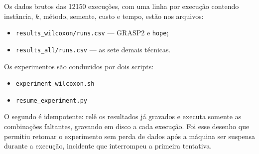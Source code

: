 \documentclass[12pt,a4paper]{article}
\begin{document}
Os dados brutos das \num{12150} execuções, com uma linha por execução
contendo instância, $k$, método, semente, custo e tempo, estão nos
arquivos:

\begin{itemize}
  \item \texttt{results\_wilcoxon/runs.csv} --- GRASP2 e \texttt{hope};
  \item \texttt{results\_all/runs.csv} --- as sete demais técnicas.
\end{itemize}

Os experimentos são conduzidos por dois scripts:

\begin{itemize}
  \item \texttt{experiment\_wilcoxon.sh}
  \item \texttt{resume\_experiment.py}
\end{itemize}

\begin{sloppypar}
O segundo é idempotente: relê os resultados já gravados e executa somente
as combinações faltantes, gravando em disco a cada execução. Foi esse
desenho que permitiu retomar o experimento sem perda de dados após a
máquina ser suspensa durante a execução, incidente que interrompeu a
primeira tentativa.
\end{sloppypar}
\end{document}

